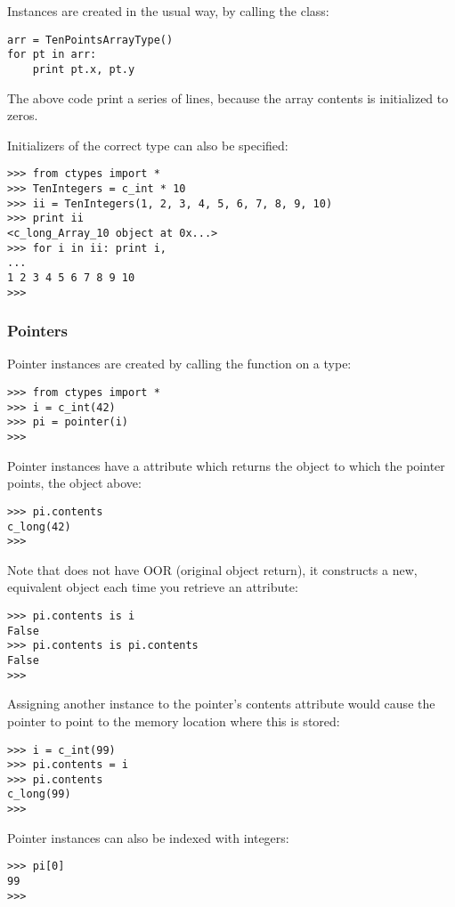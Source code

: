 Instances are created in the usual way, by calling the class:
\begin{verbatim}
arr = TenPointsArrayType()
for pt in arr:
    print pt.x, pt.y
\end{verbatim}

The above code print a series of  lines, because the array
contents is initialized to zeros.

Initializers of the correct type can also be specified:
\begin{verbatim}
>>> from ctypes import *
>>> TenIntegers = c_int * 10
>>> ii = TenIntegers(1, 2, 3, 4, 5, 6, 7, 8, 9, 10)
>>> print ii
<c_long_Array_10 object at 0x...>
>>> for i in ii: print i,
...
1 2 3 4 5 6 7 8 9 10
>>>
\end{verbatim}


\subsubsection{Pointers\label{ctypes-pointers}}

Pointer instances are created by calling the  function on a
 type:
\begin{verbatim}
>>> from ctypes import *
>>> i = c_int(42)
>>> pi = pointer(i)
>>>
\end{verbatim}

Pointer instances have a  attribute which returns the
object to which the pointer points, the  object above:
\begin{verbatim}
>>> pi.contents
c_long(42)
>>>
\end{verbatim}

Note that  does not have OOR (original object return), it
constructs a new, equivalent object each time you retrieve an
attribute:
\begin{verbatim}
>>> pi.contents is i
False
>>> pi.contents is pi.contents
False
>>>
\end{verbatim}

Assigning another  instance to the pointer's contents
attribute would cause the pointer to point to the memory location
where this is stored:
\begin{verbatim}
>>> i = c_int(99)
>>> pi.contents = i
>>> pi.contents
c_long(99)
>>>
\end{verbatim}

Pointer instances can also be indexed with integers:
\begin{verbatim}
>>> pi[0]
99
>>>
\end{verbatim}

